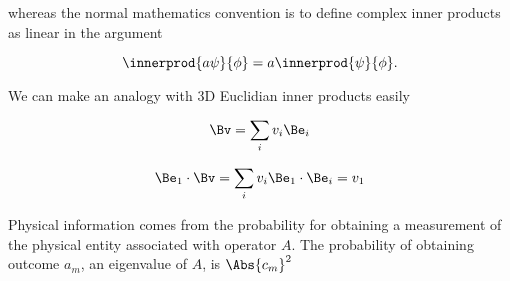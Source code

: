 whereas the normal mathematics convention is to define complex inner products as linear in the  argument

\begin{equation}\label{eqn:PHY356FLecture10:51f}
\innerprod{a \psi}{\phi} = a \innerprod{\psi}{\phi}.
\end{equation}

We can make an analogy with 3D Euclidian inner products easily

\begin{equation}\label{eqn:lecture5BigReviewCh1Formalism:91}
\begin{aligned}
\Bv = \sum_i v_i \Be_i
\end{aligned}
\end{equation}

\begin{equation}\label{eqn:lecture5BigReviewCh1Formalism:111}
\begin{aligned}
\Be_1 \cdot \Bv = \sum_i v_i \Be_1 \cdot \Be_i = v_1
\end{aligned}
\end{equation}

Physical information comes from the probability for obtaining a measurement of the physical entity associated with operator $A$.  The probability of obtaining outcome $a_m$, an eigenvalue of $A$, is $\Abs{c_m}^2$

